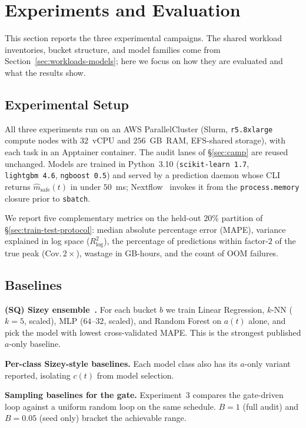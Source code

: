 \section{Experiments and Evaluation}
\label{sec:experiments}

This section reports the three experimental campaigns. The
shared workload inventories, bucket structure, and model
families come from Section~\ref{sec:workloads-models}; here we
focus on how they are evaluated and what the results show.

\subsection{Experimental Setup}
\label{sec:setup}

All three experiments run on an AWS ParallelCluster (Slurm,
\texttt{r5.8xlarge} compute nodes with $32$~vCPU and
$256$~GB~RAM, EFS-shared storage), with each task in an
Apptainer container. The audit lanes of \S\ref{sec:camp} are
reused unchanged. Models are trained in Python~3.10
(\texttt{scikit-learn~1.7}, \texttt{lightgbm~4.6},
\texttt{ngboost~0.5}) and served by a prediction daemon whose
CLI returns $\hat{m}_{\text{safe}}(t)$ in under $50$~ms;
Nextflow~\cite{ditommaso2017nextflow} invokes it from the
\texttt{process.memory} closure prior to \texttt{sbatch}.

We report five complementary metrics on the held-out $20\%$
partition of \S\ref{sec:train-test-protocol}: median absolute
percentage error (MAPE), variance explained in log space
($R^2_{\log}$), the percentage of predictions within
factor-$2$ of the true peak (Cov.\,$2\times$), wastage in
GB-hours, and the count of OOM failures.

\subsection{Baselines}
\label{sec:baselines}

\textbf{(SQ) Sizey ensemble~\cite{bader2024sizey}.} For each
bucket $b$ we train Linear Regression, $k$-NN ($k{=}5$,
scaled), MLP ($64$--$32$, scaled), and Random Forest on $a(t)$
alone, and pick the model with lowest cross-validated MAPE.
This is the strongest published $a$-only baseline.

\textbf{Per-class Sizey-style baselines.} Each model class
also has its $a$-only variant reported, isolating $c(t)$ from
model selection.

\textbf{Sampling baselines for the gate.} Experiment~3
compares the gate-driven loop against a uniform random loop
on the same schedule. $B = 1$ (full audit) and $B = 0.05$
(seed only) bracket the achievable range.

